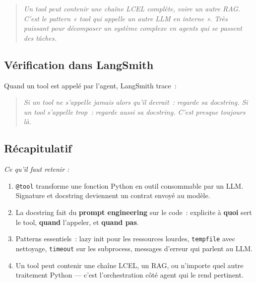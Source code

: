 \documentclass[11pt,a4paper]{article}
\begin{document}
\begin{quote}\itshape
Un tool peut contenir une chaîne LCEL complète, voire un autre RAG.
C'est le pattern « tool qui appelle un autre LLM en interne ». Très
puissant pour décomposer un système complexe en agents qui se passent
des tâches.
\end{quote}

\subsection{Vérification dans LangSmith}

Quand un tool est appelé par l'agent, LangSmith trace~:

\begin{center}
\end{center}

\begin{quote}\itshape
Si un tool ne s'appelle jamais alors qu'il \emph{devrait}~: regarde sa
docstring. Si un tool s'appelle \emph{trop}~: regarde aussi sa
docstring. C'est presque toujours là.
\end{quote}

\subsection*{Récapitulatif}
{\itshape\sloppy
\textit{Ce qu'il faut retenir :}
\begin{enumerate}[leftmargin=*]
  \item \texttt{@tool} transforme une fonction Python en outil
        consommable par un LLM. Signature et docstring deviennent un
        contrat envoyé au modèle.
  \item La docstring fait du \textbf{prompt engineering} sur le code~:
        explicite à \textbf{quoi} sert le tool, \textbf{quand} l'appeler,
        et \textbf{quand pas}.
  \item Patterns essentiels~: lazy init pour les ressources lourdes,
        \texttt{tempfile} avec nettoyage, \texttt{timeout} sur les
        subprocess, messages d'erreur qui parlent au LLM.
  \item Un tool peut contenir une chaîne LCEL, un RAG, ou n'importe
        quel autre traitement Python — c'est l'orchestration côté agent
        qui le rend pertinent.
\end{enumerate}
\par}
\end{document}
